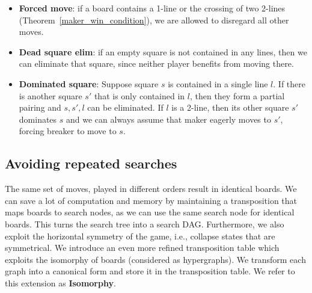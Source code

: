 \documentclass[conference]{IEEEtran}
\theoremstyle{definition}
\begin{document}
\begin{itemize}
    \item {\bf Forced move}: if a board contains a 1-line or the crossing of two 2-lines (Theorem~\ref{maker_win_condition}), we are allowed to disregard all other moves. 
    \item {\bf Dead square elim}: if an empty square is not contained in any lines, then we can eliminate that square, since neither player benefits from moving there.
    \item {\bf Dominated square}: Suppose square $s$ is contained in a single line $l$. If there is another square $s'$ that is only contained in $l$, then they form a partial pairing and $s, s', l$ can be eliminated. If $l$ is a 2-line, then its other square $s'$ dominates $s$ and we can always assume that maker eagerly moves to $s'$, forcing breaker to move to $s$.
\end{itemize}

\subsection{Avoiding repeated searches}
The same set of moves, played in different orders result in identical boards. We can save a lot of computation and memory by maintaining a transposition that maps boards to search nodes, as we can use the same search node for identical boards. This turns the search tree into a search DAG. Furthermore, we also exploit the horizontal symmetry of the game, i.e., collapse states that are symmetrical. 
We introduce an even more refined transposition table which exploits the isomorphy of boards (considered as hypergraphs). We transform each graph into a canonical form and store it in the transposition table. We refer to this extension as {\bf Isomorphy}.
\end{document}
